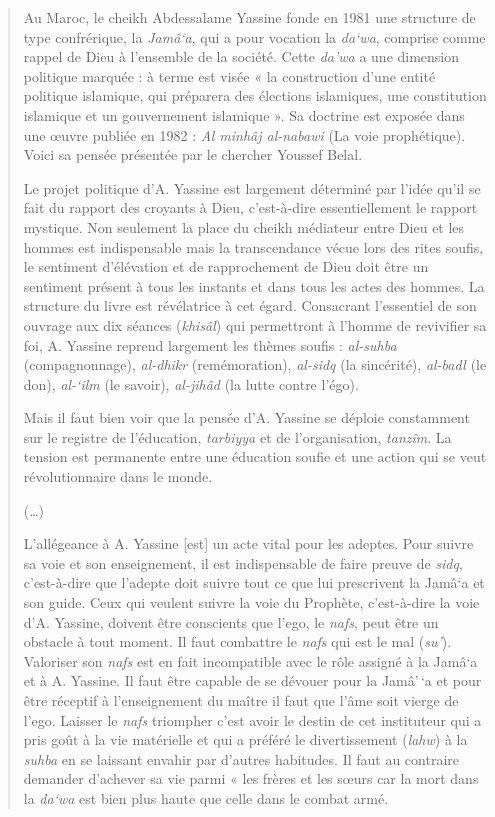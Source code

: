 \begin{quote}
Au Maroc, le cheikh Abdessalame Yassine fonde en 1981 une structure de
type confrérique, la \emph{Jamâ`a}, qui a pour vocation la \emph{da`wa},
comprise comme rappel de Dieu à l'ensemble de la société. Cette
\emph{da'wa} a une dimension politique marquée : à terme est visée « la
construction d'une entité politique islamique, qui préparera des
élections islamiques, une constitution islamique et un gouvernement
islamique ». Sa doctrine est exposée dans une œuvre publiée en 1982 :
\emph{Al minhâj al-nabawi} (La voie prophétique). Voici sa pensée
présentée par le chercher Youssef Belal.

Le projet politique d'A. Yassine est largement déterminé par l'idée
qu'il se fait du rapport des croyants à Dieu, c'est-à-dire
essentiellement le rapport mystique. Non seulement la place du cheikh
médiateur entre Dieu et les hommes est indispensable mais la
transcendance vécue lors des rites soufis, le sentiment d'élévation et
de rapprochement de Dieu doit être un sentiment présent à tous les
instants et dans tous les actes des hommes. La structure du livre est
révélatrice à cet égard. Consacrant l'essentiel de son ouvrage aux dix
séances (\emph{khisâl}) qui permettront à l'homme de revivifier sa foi,
A. Yassine reprend largement les thèmes soufis : \emph{al-suhba}
(compagnonnage), \emph{al-dhikr} (remémoration), \emph{al-sidq} (la
sincérité), \emph{al-badl} (le don), \emph{al-`ilm} (le savoir),
\emph{al-jihâd} (la lutte contre l'égo).

Mais il faut bien voir que la pensée d'A. Yassine se déploie constamment
sur le registre de l'éducation, \emph{tarbiyya} et de l'organisation,
\emph{tanzîm}. La tension est permanente entre une éducation soufie et
une action qui se veut révolutionnaire dans le monde.

(\ldots)

L'allégeance à A. Yassine {[}est{]} un acte vital pour les adeptes. Pour
suivre sa voie et son enseignement, il est indispensable de faire preuve
de \emph{sidq}, c'est-à-dire que l'adepte doit suivre tout ce que lui
prescrivent la Jamâ`a et son guide. Ceux qui veulent suivre la voie du
Prophète, c'est-à-dire la voie d'A. Yassine, doivent être conscients que
l'ego, le \emph{nafs}, peut être un obstacle à tout moment. Il faut
combattre le \emph{nafs} qui est le mal (\emph{su'}). Valoriser son
\emph{nafs} est en fait incompatible avec le rôle assigné à la Jamâ`a et
à A. Yassine. Il faut être capable de se dévouer pour la Jamâ'\,`a et
pour être réceptif à l'enseignement du maître il faut que l'âme soit
vierge de l'ego. Laisser le \emph{nafs} triompher c'est avoir le destin
de cet instituteur qui a pris goût à la vie matérielle et qui a préféré
le divertissement (\emph{lahw}) à la \emph{suhba} en se laissant envahir
par d'autres habitudes. Il faut au contraire demander d'achever sa vie
parmi « les frères et les sœurs car la mort dans la \emph{da`wa} est
bien plus haute que celle dans le combat armé.


\end{quote}
